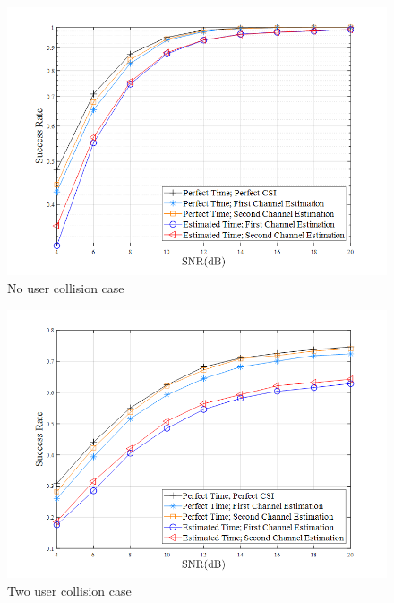 \begin{figure}[t!]
 \centering
 \includegraphics[width=15cm]{fig/RACH_nocollision_case.png}
 \caption{No user collision case}
 \label{fig:RACH_nocollision_case}
\end{figure}

\begin{figure}[b!]
 \centering
 \includegraphics[width=15cm]{fig/RACH_twocollision_case.png}
 \caption{Two user collision case}
 \label{fig:RACH_twocollision_case}
\end{figure}

